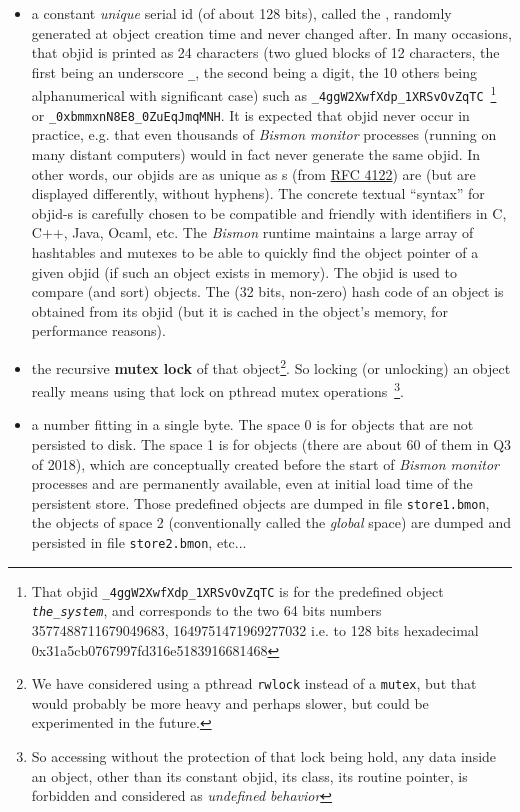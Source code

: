 \begin{itemize}
  \item a constant \emph{unique} serial id (of about 128 bits), called
    the , randomly generated at object
    creation time and never changed after. In many occasions, that
    objid is printed as 24 characters (two glued blocks of 12
    characters, the first being an underscore \texttt{\_}, the second
    being a digit, the 10 others being alphanumerical with significant
    case) such as \texttt{\_4ggW2XwfXdp\_1XRSvOvZqTC}~\footnote{That
      objid \texttt{\_4ggW2XwfXdp\_1XRSvOvZqTC} is for the predefined
      object \emph{\texttt{the\_system}}, and corresponds to the two
      64 bits numbers 3577488711679049683, 1649751471969277032 i.e. to
      128 bits hexadecimal 0x31a5cb0767997fd316e5183916681468} or
    \texttt{\_0xbmmxnN8E8\_0ZuEqJmqMNH}. It is expected that objid
     never occur in practice, e.g. that
    even thousands of \emph{Bismon monitor} processes (running on many
    distant computers) would in fact never generate the same objid. In
    other words, our objids are as unique as s (from
    \href{https://tools.ietf.org/html/rfc4122}{RFC 4122}) are (but are
    displayed differently, without hyphens). The concrete textual
    ``syntax'' for objid-s is carefully chosen to be compatible and
    friendly with identifiers in C, C++, Java, Ocaml, etc. The
    \emph{Bismon} runtime maintains a large array of hashtables and
    mutexes to be able to quickly find the object pointer of a given
    objid (if such an object exists in memory). The objid is used to
    compare (and sort) objects. The (32 bits, non-zero) hash code of
    an object is obtained from its objid (but it is cached in the
    object's memory, for performance reasons).

    \item the recursive \textbf{mutex lock} of that object\footnote{We
      have considered using a pthread \texttt{rwlock} instead of a
      \texttt{mutex}, but that would probably be more heavy and
      perhaps slower, but could be experimented in the future.}. So
      locking (or unlocking) an object really means using that lock on
      pthread mutex operations~\footnote{So accessing without the
        protection of that lock being hold, any data inside an object,
        other than its constant objid, its class, its routine pointer,
        is forbidden and considered as \emph{undefined behavior}}.

  \item a  number fitting in a single
    byte. The space 0 is for 
    objects that are not persisted to disk. The space 1 is for
     objects (there are about 60
    of them in Q3 of 2018), which are conceptually created before the
    start of \emph{Bismon monitor} processes and are permanently
    available, even at initial load time of the persistent
    store. Those predefined objects are dumped in file
    \texttt{store1.bmon}, the objects of space 2 (conventionally
    called the \emph{global} space) are dumped and persisted in file
    \texttt{store2.bmon}, etc...


\end{itemize}
